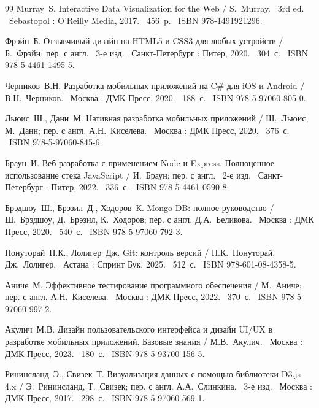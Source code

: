 \begin{thebibliography}{99}
	Murray~S. Interactive Data Visualization for the Web / S.~Murray. \textemdash\ 3rd ed. \textemdash\ Sebastopol : O'Reilly Media, 2017. \textemdash\ 456~p. \textemdash\ ISBN 978-1491921296.

	Фрэйн~Б. Отзывчивый дизайн на HTML5 и CSS3 для любых устройств / Б.~Фрэйн; пер. с англ. \textemdash\ 3-е изд. \textemdash\ Санкт-Петербург : Питер, 2020. \textemdash\ 304~с. \textemdash\ ISBN 978-5-4461-1495-5.

    

	Черников~В.Н. Разработка мобильных приложений на C\# для iOS и Android / В.Н.~Черников. \textemdash\ Москва : ДМК Пресс, 2020. \textemdash\ 188~с. \textemdash\ ISBN 978-5-97060-805-0.

	Льюис~Ш., Данн~М. Нативная разработка мобильных приложений / Ш.~Льюис, М.~Данн; пер. с англ. А.Н.~Киселева. \textemdash\ Москва : ДМК Пресс, 2020. \textemdash\ 376~с. \textemdash\ ISBN 978-5-97060-845-6.

	Браун~И. Веб-разработка с применением Node и Express. Полноценное использование стека JavaScript / И.~Браун; пер. с англ. \textemdash\ 2-е изд. \textemdash\ Санкт-Петербург : Питер, 2022. \textemdash\ 336~с. \textemdash\ ISBN 978-5-4461-0590-8.

	Брэдшоу~Ш., Брэзил~Д., Ходоров~К. Mongo DB: полное руководство / Ш.~Брэдшоу, Д.~Брэзил, К.~Ходоров; пер. с англ. Д.А.~Беликова. \textemdash\ Москва : ДМК Пресс, 2020. \textemdash\ 540~с. \textemdash\ ISBN 978-5-97060-792-3.

	Понуторай~П.К., Лолигер~Дж. Git: контроль версий / П.К.~Понуторай, Дж.~Лолигер. \textemdash\ Астана : Спринт Бук, 2025. \textemdash\ 512~с. \textemdash\ ISBN 978-601-08-4358-5.

	Аниче~М. Эффективное тестирование программного обеспечения / М.~Аниче; пер. с англ. А.Н.~Киселева. \textemdash\ Москва : ДМК Пресс, 2022. \textemdash\ 370~с. \textemdash\ ISBN 978-5-97060-997-2.

	Акулич~М.В. Дизайн пользовательского интерфейса и дизайн UI/UX в разработке мобильных приложений. Базовые знания / М.В.~Акулич. \textemdash\ Москва : ДМК Пресс, 2023. \textemdash\ 180~с. \textemdash\ ISBN 978-5-93700-156-5.

	Рининсланд~Э., Свизек~Т. Визуализация данных с помощью библиотеки D3.js 4.x / Э.~Рининсланд, Т.~Свизек; пер. с англ. А.А.~Слинкина. \textemdash\ 3-е изд. \textemdash\ Москва : ДМК Пресс, 2017. \textemdash\ 298~с. \textemdash\ ISBN 978-5-97060-569-1.


\end{thebibliography}
